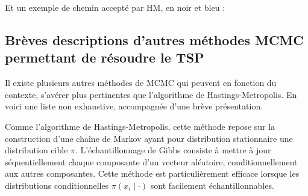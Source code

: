 \documentclass{article}
\begin{document}
\begin{tcolorbox}[colback=white,colframe=yellow!80!black,title=Exemple 2, breakable]
Et un exemple de chemin accepté par HM, en noir et bleu :
\begin{center}
\end{center}
\end{tcolorbox}



\newpage
\subsection{Brèves descriptions d'autres méthodes MCMC permettant de résoudre le TSP}

Il existe plusieurs autres méthodes de MCMC qui peuvent en fonction du contexte, s'avérer plus pertinentes que l'algorithme de Hastings-Metropolis.
En voici une liste non exhaustive, accompagnée d'une brève présentation. \\

\begin{tcolorbox}[colback=white,colframe=yellow!80!black,title=L'échantillonnage de Gibbs]
Comme l'algorithme de Hastings-Metropolis, 
cette méthode repose sur la construction d'une chaîne de Markov ayant pour distribution stationnaire une distribution cible $\pi$. 
L'échantillonnage de Gibbs consiste à mettre à jour séquentiellement chaque composante d'un vecteur aléatoire, conditionnellement aux autres composantes. 
Cette méthode est particulièrement efficace lorsque les distributions conditionnelles $\pi(x_i \mid \cdot)$ sont facilement échantillonnables.
\end{tcolorbox}
\end{document}

